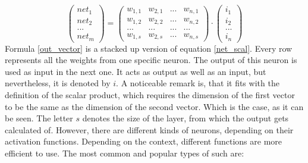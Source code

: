 \documentclass[12pt]{article}
\begin{document}
\begin{equation}
    \begin{pmatrix}net_{1}\\ net_{2}\\ ...\\ net_{m}\end{pmatrix} =\begin{pmatrix}
w_{1, 1} & w_{2, 1}  & ... &w_{n,1} \\ 
w_{1, 2} & w_{2, 2} & ... & w_{n,2} \\ 
... & ... &  ... & ...\\ 
w_{1,s} & w_{2, s} & ...  & w_{n, s}
\end{pmatrix} \cdot \begin{pmatrix}
i_{1}\\ 
i_{2}\\ 
...\\
i_{n}
\end{pmatrix}
\label{out_vector}
\end{equation}
Formula \ref{out_vector} is a stacked up version of equation \ref{net_scal}. Every row represents all the \glspl{weight} from one specific neuron. The output of this \gls{neuron} is used as  \gls{input} in the next one. It acts as output as well as an  \gls{input}, but nevertheless, it is denoted by $i$. A noticeable remark is, that it fits with the definition of the \gls{scalar product}, which requires the dimension of the first \gls{vector} to be the same as the dimension of the second \gls{vector}. Which is the case, as it can be seen. The letter $s$ denotes the \gls{size} of the layer, from which the output gets calculated of.
However, there are different kinds of \glspl{neuron}, depending on their \glspl{activation function}. Depending on the context, different functions are more efficient to use. The most common and popular types of such are:  \cite{neuronal_network}
\end{document}

